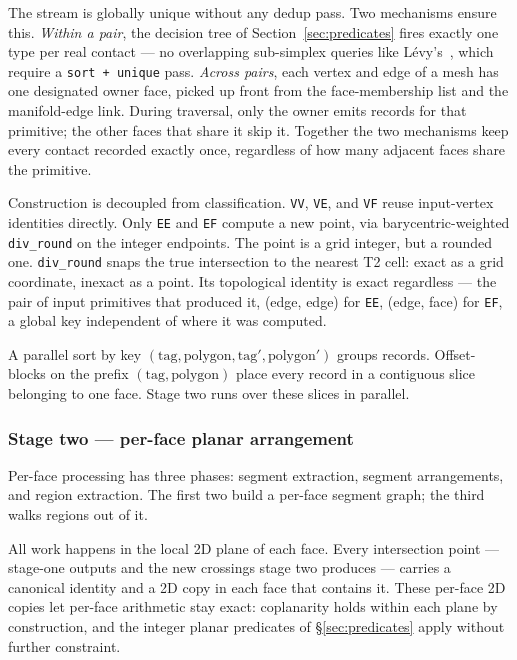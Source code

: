 \documentclass{egpubl}
\begin{document}
The stream is globally unique without any dedup pass. Two mechanisms ensure this. \emph{Within a pair}, the decision tree of Section~\ref{sec:predicates} fires exactly one type per real contact --- no overlapping sub-simplex queries like L\'evy's~\cite{Levy2025}, which require a \texttt{sort + unique} pass. \emph{Across pairs}, each vertex and edge of a mesh has one designated owner face, picked up front from the face-membership list and the manifold-edge link. During traversal, only the owner emits records for that primitive; the other faces that share it skip it. Together the two mechanisms keep every contact recorded exactly once, regardless of how many adjacent faces share the primitive.

Construction is decoupled from classification. \texttt{VV}, \texttt{VE}, and \texttt{VF} reuse input-vertex identities directly. Only \texttt{EE} and \texttt{EF} compute a new point, via barycentric-weighted \texttt{div\_round} on the integer endpoints. The point is a grid integer, but a rounded one. \texttt{div\_round} snaps the true intersection to the nearest T2 cell: exact as a grid coordinate, inexact as a point. Its topological identity is exact regardless --- the pair of input primitives that produced it, (edge, edge) for \texttt{EE}, (edge, face) for \texttt{EF}, a global key independent of where it was computed.

A parallel sort by key $(\text{tag}, \text{polygon}, \text{tag}', \text{polygon}')$ groups records. Offset-blocks on the prefix $(\text{tag}, \text{polygon})$ place every record in a contiguous slice belonging to one face. Stage two runs over these slices in parallel.

\subsubsection*{Stage two --- per-face planar arrangement}

Per-face processing has three phases: segment extraction, segment arrangements, and region extraction. The first two build a per-face segment graph; the third walks regions out of it.

All work happens in the local 2D plane of each face. Every intersection point --- stage-one outputs and the new crossings stage two produces --- carries a canonical identity and a 2D copy in each face that contains it. These per-face 2D copies let per-face arithmetic stay exact: coplanarity holds within each plane by construction, and the integer planar predicates of \S\ref{sec:predicates} apply without further constraint.
\end{document}
